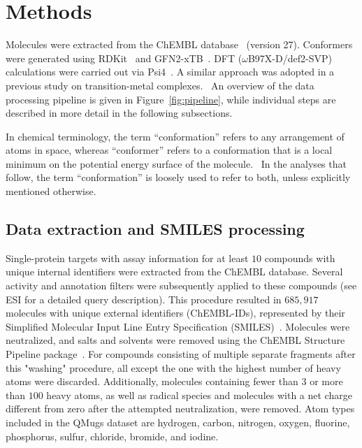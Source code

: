 \section*{Methods}
Molecules were extracted from the ChEMBL database~\cite{mendez2019chembl} (version 27). Conformers were generated using RDKit~\cite{rdkit} and GFN2-xTB~\cite{grimme2017robust, bannwarth2019gfn2, grimme2019exploration, bannwarth2020extended}. DFT ($\omega$B97X-D/def2-SVP) calculations were carried out via Psi4~\cite{smith2020psi4}. A similar approach was adopted in a previous study on transition-metal complexes.~\cite{balcells2020tmqm} An overview of the data processing pipeline is given in Figure~\ref{fig:pipeline}, while individual steps are described in more detail in the following subsections.

In chemical terminology, the term ``conformation'' refers to any arrangement of atoms in space, whereas ``conformer'' refers to a conformation that is a local minimum on the potential energy surface of the molecule.~\cite{moss1996basic} In the analyses that follow, the term ``conformation'' is loosely used to refer to both, unless explicitly mentioned otherwise.


\subsection*{Data extraction and SMILES processing}

Single-protein targets with assay information for at least $10$ compounds with unique internal identifiers were extracted from the ChEMBL database. Several activity and annotation filters were subsequently applied to these compounds (see ESI for a detailed query description). This procedure resulted in $685,917$ molecules with unique external identifiers (ChEMBL-IDs), represented by their Simplified Molecular Input Line Entry Specification (SMILES)~\cite{weininger1988smiles}. Molecules were neutralized, and salts and solvents were removed using the ChEMBL Structure Pipeline package~\cite{Bento2020, chembl_structure_pipeline_repo}. For compounds consisting of multiple separate fragments after this "washing" procedure, all except the one with the highest number of heavy atoms were discarded. Additionally, molecules containing fewer than $3$ or more than $100$ heavy atoms, as well as radical species and molecules with a net charge different from zero after the attempted neutralization, were removed. Atom types included in the QMugs dataset are hydrogen, carbon, nitrogen, oxygen, fluorine, phosphorus, sulfur, chloride, bromide, and iodine.


